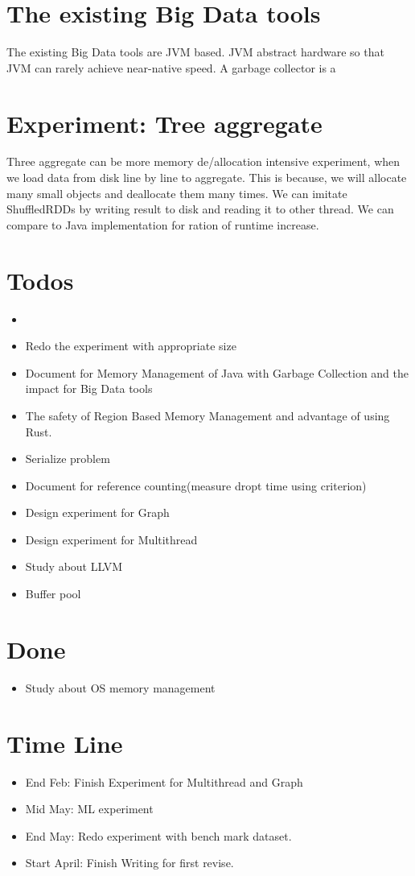 \section{The existing Big Data tools}
\label{sec:history}
The existing Big Data tools are JVM based. JVM abstract hardware so that JVM can rarely achieve near-native speed. A garbage collector is a

\section{Experiment: Tree aggregate}
\label{sec:history}
Three aggregate can be more memory de/allocation intensive experiment, when we load data from disk line by line to aggregate.
This is because, we will allocate many small objects and deallocate them many times.
We can imitate ShuffledRDDs by writing result to disk and reading it to other thread.  
We can compare to Java implementation for ration of runtime increase.





\section{Todos}
\label{sec:history}
\begin{itemize}
    \item 
    \item Redo the experiment with appropriate size
    \item Document for Memory Management of Java with Garbage Collection and the impact for Big Data tools
    \item The safety of Region Based Memory Management and advantage of using Rust.
    \item Serialize problem 
    \item Document for reference counting(measure dropt time using criterion)
    \item Design experiment for Graph
    \item Design experiment for Multithread
    \item Study about LLVM
    \item Buffer pool
\end{itemize}

\section{Done}
\label{sec:history}
\begin{itemize}
    \item Study about OS memory management
\end{itemize}


\section{Time Line}
\label{sec:history}
\begin{itemize}
    \item End Feb: Finish Experiment for Multithread and Graph
    \item Mid May: ML experiment
    \item End May: Redo experiment with bench mark dataset.
    \item Start April: Finish Writing for first revise.
\end{itemize}



